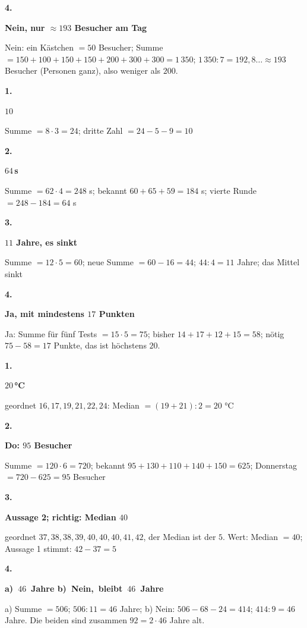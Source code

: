 \documentclass[11pt]{article}
\newcommand{\lsg}[3]{\par\noindent\begin{minipage}[t]{9mm}\textbf{#1}\end{minipage}%
  \begin{minipage}[t]{52mm}\raggedright\bfseries\boldmath #2\end{minipage}\hspace{3mm}%
  \begin{minipage}[t]{\dimexpr\linewidth-64mm\relax}\raggedright\small #3\end{minipage}\par\vspace{4pt}}
\begin{document}
\lsg{4.}{Nein, nur $\approx 193$ Besucher am Tag}{Nein: ein Kästchen $= 50$ Besucher; Summe $= 150 + 100 + 150 + 150 + 200 + 300 + 300 = 1\,350$; $1\,350 : 7 = 192{,}8\ldots \approx 193$ Besucher (Personen ganz), also weniger als $200$.}
\par\Needspace{25mm}\vspace{6pt}\noindent\colorbox{black!12}{}\hspace{2mm}{\bfseries Mittel rückwärts und Änderungen}\par\vspace{4pt}
\lsg{1.}{$10$}{Summe $= 8 \cdot 3 = 24$; dritte Zahl $= 24 - 5 - 9 = 10$}
\lsg{2.}{$64$\,s}{Summe $= 62 \cdot 4 = 248$ s; bekannt $60 + 65 + 59 = 184$ s; vierte Runde $= 248 - 184 = 64$ s}
\lsg{3.}{$11$ Jahre, es sinkt}{Summe $= 12 \cdot 5 = 60$; neue Summe $= 60 - 16 = 44$; $44 : 4 = 11$ Jahre; das Mittel sinkt}
\lsg{4.}{Ja, mit mindestens $17$ Punkten}{Ja: Summe für fünf Tests $= 15 \cdot 5 = 75$; bisher $14 + 17 + 12 + 15 = 58$; nötig $75 - 58 = 17$ Punkte, das ist höchstens $20$.}
\par\Needspace{25mm}\vspace{6pt}\noindent\colorbox{black!12}{}\hspace{2mm}{\bfseries Probetest}\par\vspace{4pt}
\lsg{1.}{$20$\,°C}{geordnet $16, 17, 19, 21, 22, 24$: Median $= (19 + 21) : 2 = 20$ °C}
\lsg{2.}{Do: $95$ Besucher}{Summe $= 120 \cdot 6 = 720$; bekannt $95 + 130 + 110 + 140 + 150 = 625$; Donnerstag $= 720 - 625 = 95$ Besucher}
\lsg{3.}{Aussage 2; richtig: Median $40$}{geordnet $37, 38, 38, 39, 40, 40, 40, 41, 42$, der Median ist der $5.$ Wert: Median $= 40$; Aussage 1 stimmt: $42 - 37 = 5$}
\lsg{4.}{\mbox{a) $46$ Jahre} \mbox{b) Nein, bleibt $46$ Jahre}}{a) Summe $= 506$; $506 : 11 = 46$ Jahre; b) Nein: $506 - 68 - 24 = 414$; $414 : 9 = 46$ Jahre. Die beiden sind zusammen $92 = 2 \cdot 46$ Jahre alt.}
\end{document}
